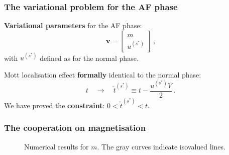 \begin{frame}
	\frametitle{The variational problem for the AF phase}
	
	\textbf{Variational parameters} for the AF phase:
	\[
	\mathbf{v} = \begin{bmatrix}
		m \\ u^{(s^*)}
	\end{bmatrix} \, \text{,}
	\]
	with $u^{(s^*)}$ defined as for the normal phase. \bigskip
	
	\begin{tabbox}[frametitle=Renormalisation of kinetics]
		Mott localisation effect \textbf{formally} identical to the normal phase:
		\[
		t \quad\to\quad \tilde{t}^{(s^*)} \equiv t - \frac{u^{(s^*)}V}{2} \, \text{.}
		\]
		We have proved the \textbf{constraint}: $0 < \tilde{t}^{(s^*)} < t$.
	\end{tabbox}
	
\end{frame}

\begin{frame}
	\frametitle{The cooperation on magnetisation}
	
	\begin{figure}
		\centering
		
		\caption{Numerical results for $m$. The gray curves indicate isovalued lines.}
	\end{figure}
	
	\begin{columns}
		
	\end{columns}
	
\end{frame}

